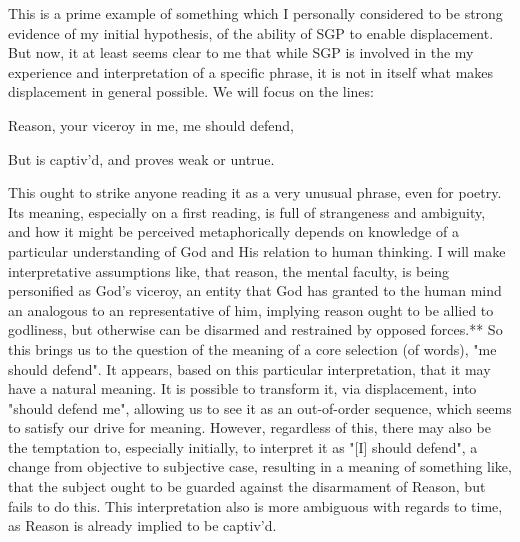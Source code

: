 \documentclass[]{article}
\begin{document}
This is a prime example of something which I personally considered to be strong evidence of my initial hypothesis, of the ability of SGP to enable displacement. But now, it at least seems clear to me that while SGP is involved in the my experience and interpretation of a specific phrase, it is not in itself what makes displacement in general possible. We will focus on the lines:



Reason, your viceroy in me, me should defend,

But is captiv'd, and proves weak or untrue.


This ought to strike anyone reading it as a very unusual phrase, even for poetry. Its meaning, especially on a first reading, is full of strangeness and ambiguity, and how it might be perceived metaphorically depends on knowledge of a particular understanding of God and His relation to human thinking. I will make interpretative assumptions like, that reason, the mental faculty, is being personified as God's viceroy, an entity that God has granted to the human mind an analogous to an representative of him, implying reason ought to be allied to godliness, but otherwise can be disarmed and restrained by opposed forces.** So this brings us to the question of the meaning of a core selection (of words), "me should defend". It appears, based on this particular interpretation, that it may have a natural meaning. It is possible to transform it, via displacement, into "should defend me", allowing us to see it as an out-of-order sequence, which seems to satisfy our drive for meaning. However, regardless of this, there may also be the temptation to, especially initially, to interpret it as "[I] should defend", a change from objective to subjective case, resulting in a meaning of something like, that the subject ought to be guarded against the disarmament of Reason, but fails to do this. This interpretation also is more ambiguous with regards to time, as Reason is already implied to be captiv'd.
\end{document}
